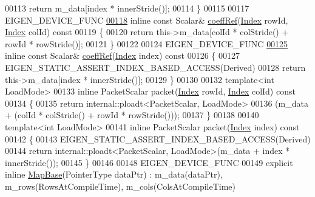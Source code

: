 \begin{DoxyCode}
00113       \textcolor{keywordflow}{return} m\_data[index * innerStride()];
00114     \}
00115 
00117     EIGEN\_DEVICE\_FUNC
\hyperlink{group___core___module_ad4e9a2bf0255f870a45ce88e30815b59}{00118}     \textcolor{keyword}{inline} \textcolor{keyword}{const} Scalar& \hyperlink{group___core___module_ad4e9a2bf0255f870a45ce88e30815b59}{coeffRef}(\hyperlink{namespace_eigen_a62e77e0933482dafde8fe197d9a2cfde}{Index} rowId, \hyperlink{namespace_eigen_a62e77e0933482dafde8fe197d9a2cfde}{Index} colId)\textcolor{keyword}{ const}
00119 \textcolor{keyword}{    }\{
00120       \textcolor{keywordflow}{return} this->m\_data[colId * colStride() + rowId * rowStride()];
00121     \}
00122 
00124     EIGEN\_DEVICE\_FUNC
\hyperlink{group___core___module_abae7b3615ed05ef13cd06065fe71c98e}{00125}     \textcolor{keyword}{inline} \textcolor{keyword}{const} Scalar& \hyperlink{group___core___module_abae7b3615ed05ef13cd06065fe71c98e}{coeffRef}(\hyperlink{namespace_eigen_a62e77e0933482dafde8fe197d9a2cfde}{Index} index)\textcolor{keyword}{ const}
00126 \textcolor{keyword}{    }\{
00127       EIGEN\_STATIC\_ASSERT\_INDEX\_BASED\_ACCESS(Derived)
00128       \textcolor{keywordflow}{return} this->m\_data[index * innerStride()];
00129     \}
00130 
00132     \textcolor{keyword}{template}<\textcolor{keywordtype}{int} LoadMode>
00133     \textcolor{keyword}{inline} PacketScalar packet(\hyperlink{namespace_eigen_a62e77e0933482dafde8fe197d9a2cfde}{Index} rowId, \hyperlink{namespace_eigen_a62e77e0933482dafde8fe197d9a2cfde}{Index} colId)\textcolor{keyword}{ const}
00134 \textcolor{keyword}{    }\{
00135       \textcolor{keywordflow}{return} internal::ploadt<PacketScalar, LoadMode>
00136                (m\_data + (colId * colStride() + rowId * rowStride()));
00137     \}
00138 
00140     \textcolor{keyword}{template}<\textcolor{keywordtype}{int} LoadMode>
00141     \textcolor{keyword}{inline} PacketScalar packet(\hyperlink{namespace_eigen_a62e77e0933482dafde8fe197d9a2cfde}{Index} index)\textcolor{keyword}{ const}
00142 \textcolor{keyword}{    }\{
00143       EIGEN\_STATIC\_ASSERT\_INDEX\_BASED\_ACCESS(Derived)
00144       \textcolor{keywordflow}{return} internal::ploadt<PacketScalar, LoadMode>(m\_data + index * innerStride());
00145     \}
00146 
00148     EIGEN\_DEVICE\_FUNC
00149     \textcolor{keyword}{explicit} \textcolor{keyword}{inline} \hyperlink{class_eigen_1_1_map_base}{MapBase}(PointerType dataPtr) : m\_data(dataPtr), m\_rows(RowsAtCompileTime), 
      m\_cols(ColsAtCompileTime)

\end{DoxyCode}
